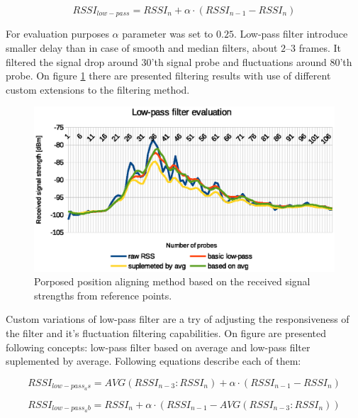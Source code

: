 \documentclass[../main.tex]{subfiles}
\begin{document}
\begin{equation}
\label{eq:low-pass_filter}
	RSSI_{low-pass} = RSSI_{n} + \alpha \cdot (RSSI_{n-1} - RSSI_{n})
\end{equation}

For evaluation purposes $\alpha$ parameter was set to $0.25$. Low-pass filter introduce smaller delay than in case of smooth and median filters, about $2$--$3$ frames. It filtered the signal drop around $30$'th signal probe and fluctuations around $80$'th probe. On figure \ref{fig:filtering_low-pass} there are presented filtering results with use of different custom extensions to the filtering method.

\begin{figure}[!htbp]
\includegraphics[width=\textwidth]{pictures/filtering_low-pass}
\centering
\caption{Porposed position aligning method based on the received signal strengths from reference points.}
\label{fig:filtering_low-pass}
\end{figure}

Custom variations of low-pass filter are a try of adjusting the responsiveness of the filter and it's fluctuation filtering capabilities. On figure are presented following concepts: low-pass filter based on average and low-pass filter suplemented by average. Following equations describe each of them:

\begin{equation}
\label{eq:low-pass_filter_avg_based}
	RSSI_{low-pass_as} = AVG(RSSI_{n-3}:RSSI_{n}) + \alpha \cdot (RSSI_{n-1} - RSSI_{n})
\end{equation}

\begin{equation}
\label{eq:low-pass_filter_avg_supplemented}
	RSSI_{low-pass_ab} = RSSI_{n} + \alpha \cdot (RSSI_{n-1} - AVG(RSSI_{n-3}:RSSI_{n}))
\end{equation}
\end{document}
